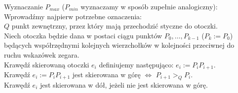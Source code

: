 \documentclass[11pt]{article}
\theoremstyle{remark} \newtheorem{definition}{def.}
\theoremstyle{definition} \newtheorem{twierdzenie}{tw.}
\begin{document}
        Wyznaczanie $P_{max}$ ($P_{min}$ wyznaczamy w sposób zupełnie analogiczny):\\
        Wprowadźmy najpierw potrzebne oznaczenia: \\
        $Q$ punkt zewnętrzny, przez który mają przechodzić styczne do otoczki.\\
        Niech otoczka będzie dana w postaci ciągu punktów $P_0, \ldots, P_{k-1}$ ($P_k := P_0$) będących współrzędnymi kolejnych wierzchołków w kolejności przeciwnej
        do ruchu wskazówek zegara.\\ 
        Krawędź skierowaną otoczki $e_i$ definiujemy następująco: $e_i := P_iP_{i+1}$. \\
        Krawędź $e_i := P_iP_{i+1}$ jest skierowana w górę $\Leftrightarrow$ $P_{i+1} >_Q P_i$.\\
        Krawędź $e_i$ jest skierowana w dół, jeżeli nie jest skierowana w górę. 
\end{document}
